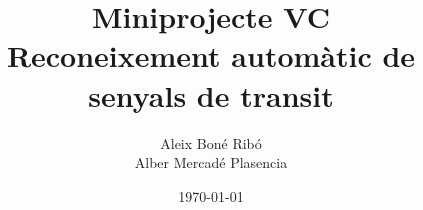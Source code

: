 



\usepackage{pdfpages}

\title{Miniprojecte VC\\ \Large \normalfont Reconeixement automàtic de senyals
de transit}
\author{Aleix Bon\'e Rib\'o\\ Alber Mercad\'e Plasencia}
\date{\today}




    



    \tableofcontents \pagebreak



    \setlength{\parskip}{1em plus 0.5em minus 0.2em}


    
    
    
    
    
    



    \appendix

    


